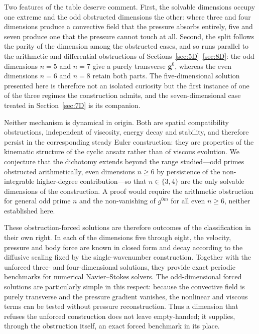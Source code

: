 \documentclass[11pt]{jfm}
\let\ge=\geqslant  \let\geq=\geqslant
\numberwithin{equation}{section}
\begin{document}
Two features of the table deserve comment. First, the solvable dimensions occupy one extreme and
the odd obstructed dimensions the other: where three and four dimensions produce a convective
field that the pressure absorbs entirely, five and seven produce one that the pressure cannot
touch at all. Second, the split follows the parity of the dimension among the obstructed cases,
and so runs parallel to the arithmetic and differential obstructions of
Sections~\ref{sec:5D}--\ref{sec:8D}: the odd dimensions $n=5$ and $n=7$ give a purely transverse
$\boldsymbol{g}^0$, whereas the even dimensions $n=6$ and $n=8$ retain both parts. The
five-dimensional solution presented here is therefore not an isolated curiosity but the first
instance of one of the three regimes the construction admits, and the seven-dimensional case
treated in Section~\ref{sec:7D} is its companion.

\noindent Neither mechanism is dynamical in origin. Both are spatial compatibility obstructions, independent
of viscosity, energy decay and stability, and therefore persist in the corresponding steady Euler
construction: they are properties of the kinematic
structure of the cyclic ansatz rather than of viscous evolution. We conjecture that the dichotomy
extends beyond the range studied---odd primes obstructed arithmetically, even dimensions $n\ge6$
by persistence of the non-integrable higher-degree contribution---so that $n\in\{3,4\}$ are the
only solvable dimensions of the construction. A proof would require the arithmetic obstruction for
general odd prime $n$ and the non-vanishing of $g^{0m}$ for all even $n\ge6$, neither established
here.

These obstruction-forced solutions are therefore outcomes of the classification in their own
right. In each of the dimensions five through eight, the velocity, pressure and body force are
known in closed form and decay according to the diffusive scaling fixed by the
single-wavenumber construction. Together with the unforced three- and four-dimensional
solutions, they provide exact periodic benchmarks for numerical Navier--Stokes solvers. The
odd-dimensional forced solutions are particularly simple in this respect: because the
convective field is purely transverse and the pressure gradient vanishes, the nonlinear and
viscous terms can be tested without pressure reconstruction. Thus a dimension that refuses
the unforced construction does not leave empty-handed; it supplies, through the obstruction
itself, an exact forced benchmark in its place.
\end{document}
